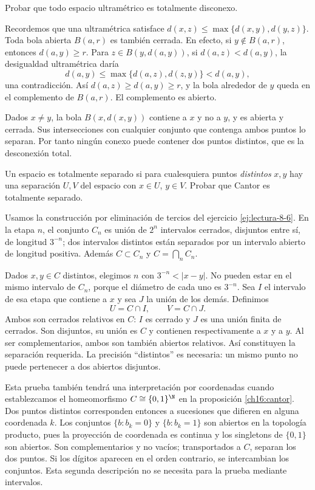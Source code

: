 \begin{ejercicio}\label{ej:lectura-18-2}
Probar que todo espacio ultramétrico es totalmente disconexo.
\end{ejercicio}
\begin{solucion}
Recordemos que una ultramétrica satisface $d(x,z)\le\max\{d(x,y),d(y,z)\}$. Toda bola abierta $B(a,r)$ es también cerrada. En efecto, si $y\notin B(a,r)$, entonces $d(a,y)\ge r$. Para $z\in B(y,d(a,y))$, si $d(a,z)<d(a,y)$, la desigualdad ultramétrica daría
\[
d(a,y)\le\max\{d(a,z),d(z,y)\}<d(a,y),
\]
una contradicción. Así $d(a,z)\ge d(a,y)\ge r$, y la bola alrededor de $y$ queda en el complemento de $B(a,r)$. El complemento es abierto.

Dados $x\ne y$, la bola $B(x,d(x,y))$ contiene a $x$ y no a $y$, y es abierta y cerrada. Sus intersecciones con cualquier conjunto que contenga ambos puntos lo separan. Por tanto ningún conexo puede contener dos puntos distintos, que es la desconexión total.
\end{solucion}

\begin{ejercicio}\label{ej:lectura-18-3}
Un espacio es totalmente separado si para cualesquiera puntos \emph{distintos} $x,y$ hay una separación $U,V$ del espacio con $x\in U$, $y\in V$. Probar que Cantor es totalmente separado.
\end{ejercicio}
\begin{solucion}
Usamos la construcción por eliminación de tercios del ejercicio \ref{ej:lectura-8-6}. En la etapa $n$, el conjunto $C_n$ es unión de $2^n$ intervalos cerrados, disjuntos entre sí, de longitud $3^{-n}$; dos intervalos distintos están separados por un intervalo abierto de longitud positiva. Además $C\subset C_n$ y $C=\bigcap_n C_n$.

Dados $x,y\in C$ distintos, elegimos $n$ con $3^{-n}<|x-y|$. No pueden estar en el mismo intervalo de $C_n$, porque el diámetro de cada uno es $3^{-n}$. Sea $I$ el intervalo de esa etapa que contiene a $x$ y sea $J$ la unión de los demás. Definimos
\[
U=C\cap I,\qquad V=C\cap J.
\]
Ambos son cerrados relativos en $C$: $I$ es cerrado y $J$ es una unión finita de cerrados. Son disjuntos, su unión es $C$ y contienen respectivamente a $x$ y a $y$. Al ser complementarios, ambos son también abiertos relativos. Así constituyen la separación requerida. La precisión ``distintos'' es necesaria: un mismo punto no puede pertenecer a dos abiertos disjuntos.

Esta prueba también tendrá una interpretación por coordenadas cuando establezcamos el homeomorfismo $C\cong\{0,1\}^{\N}$ en la proposición \ref{ch16:cantor}. Dos puntos distintos corresponden entonces a sucesiones que difieren en alguna coordenada $k$. Los conjuntos $\{b:b_k=0\}$ y $\{b:b_k=1\}$ son abiertos en la topología producto, pues la proyección de coordenada es continua y los singletons de $\{0,1\}$ son abiertos. Son complementarios y no vacíos; transportados a $C$, separan los dos puntos. Si los dígitos aparecen en el orden contrario, se intercambian los conjuntos. Esta segunda descripción no se necesita para la prueba mediante intervalos.
\end{solucion}

